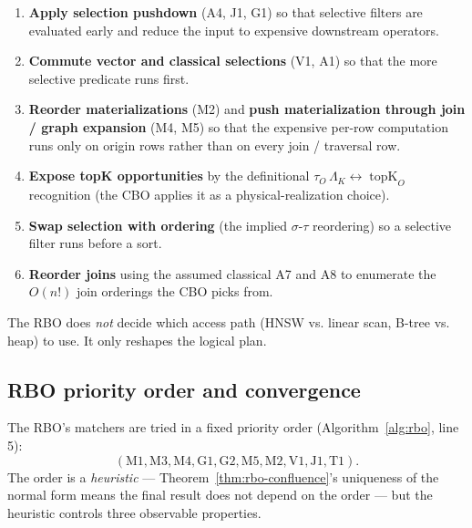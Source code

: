 \documentclass[sigconf,nonacm,review]{acmart}
\theoremstyle{plain}
\theoremstyle{definition}
\newcommand{\topK}{\operatorname{topK}}
\theoremstyle{remark}
\begin{document}
\begin{enumerate}[leftmargin=*]
  \item \textbf{Apply selection pushdown} (A4, J1, G1) so that
    selective filters are evaluated early and reduce the input to
    expensive downstream operators.
  \item \textbf{Commute vector and classical selections} (V1, A1) so
    that the more selective predicate runs first.
  \item \textbf{Reorder materializations} (M2) and \textbf{push
    materialization through join / graph expansion} (M4, M5) so
    that the expensive per-row computation runs only on origin
    rows rather than on every join / traversal row.
  \item \textbf{Expose topK opportunities} by the definitional
    $\tau_O\, \Lambda_K \leftrightarrow \topK_O$ recognition (the
    CBO applies it as a physical-realization choice).
  \item \textbf{Swap selection with ordering} (the implied
    $\sigma$-$\tau$ reordering) so a selective filter runs before
    a sort.
  \item \textbf{Reorder joins} using the assumed classical A7 and
    A8 to enumerate the $O(n!)$ join orderings the CBO picks
    from.
\end{enumerate}

The RBO does \emph{not} decide which access path (HNSW vs. linear
scan, B-tree vs. heap) to use. It only reshapes the logical plan.

\subsection{RBO priority order and convergence}\label{sec:rbo:order}

The RBO's matchers are tried in a fixed priority order
(Algorithm~\ref{alg:rbo}, line 5):
\[
(\mathrm{M1}, \mathrm{M3}, \mathrm{M4}, \mathrm{G1},
\mathrm{G2}, \mathrm{M5}, \mathrm{M2}, \mathrm{V1},
\mathrm{J1}, \mathrm{T1}).
\]
The order is a \emph{heuristic} --- Theorem~\ref{thm:rbo-confluence}'s
uniqueness of the normal form means the final
result does not depend on the order --- but the
heuristic controls three observable properties.
\end{document}
